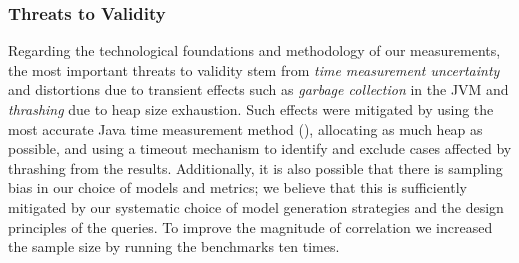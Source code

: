 
\subsubsection{Threats to Validity}
Regarding the technological foundations and methodology of our measurements, the
most important threats to validity stem from \emph{time measurement uncertainty}
and distortions due to transient effects such as \emph{garbage collection} in
the JVM and \emph{thrashing} due to heap size exhaustion. Such effects were
mitigated by using the most accurate Java time measurement method
(), allocating as much heap as possible, and using a
timeout mechanism to identify and exclude cases affected by thrashing from the
results.
Additionally, it is also possible that there is sampling bias in our choice of
models and metrics; we believe that this is sufficiently mitigated by our
systematic choice of model generation strategies and the design principles of
the queries. To improve the magnitude of correlation we increased the sample
size by running the benchmarks ten times.